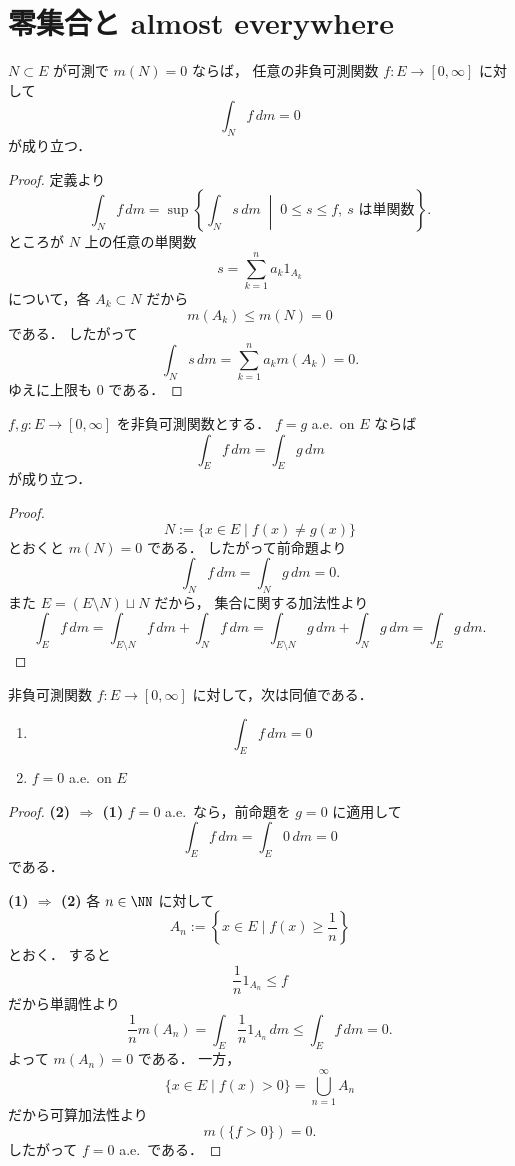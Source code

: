 \section{零集合と almost everywhere}

\begin{proposition}[零集合上の積分]
$N \subset E$ が可測で $m(N)=0$ ならば，
任意の非負可測関数 $f:E \to [0,\infty]$ に対して
\[
\int_N f\,dm=0
\]
が成り立つ．
\end{proposition}
\begin{proof}
定義より
\[
\int_N f\,dm
=
\sup\left\{
\int_N s\,dm
\;\middle|\;
0 \le s \le f,\ s \text{ は単関数}
\right\}.
\]
ところが $N$ 上の任意の単関数
\[
s=\sum_{k=1}^n a_k1_{A_k}
\]
について，各 $A_k \subset N$ だから
\[
m(A_k)\le m(N)=0
\]
である．
したがって
\[
\int_N s\,dm
=
\sum_{k=1}^n a_k m(A_k)=0.
\]
ゆえに上限も $0$ である．
\end{proof}

\begin{proposition}
$f,g:E \to [0,\infty]$ を非負可測関数とする．
$f=g$ a.e.\ on $E$ ならば
\[
\int_E f\,dm=\int_E g\,dm
\]
が成り立つ．
\end{proposition}
\begin{proof}
\[
N:=\{x \in E \mid f(x)\ne g(x)\}
\]
とおくと $m(N)=0$ である．
したがって前命題より
\[
\int_N f\,dm=\int_N g\,dm=0.
\]
また $E=(E\setminus N)\sqcup N$ だから，
集合に関する加法性より
\[
\int_E f\,dm
=
\int_{E\setminus N} f\,dm+\int_N f\,dm
=
\int_{E\setminus N} g\,dm+\int_N g\,dm
=
\int_E g\,dm.
\]
\end{proof}

\begin{proposition}
非負可測関数 $f:E \to [0,\infty]$ に対して，次は同値である．
\begin{enumerate}
    \item
    \[
    \int_E f\,dm=0
    \]
    \item $f=0$ a.e.\ on $E$
\end{enumerate}
\end{proposition}
\begin{proof}
\textbf{(2) $\Rightarrow$ (1)}\quad
$f=0$ a.e.\ なら，前命題を $g=0$ に適用して
\[
\int_E f\,dm=\int_E 0\,dm=0
\]
である．

\textbf{(1) $\Rightarrow$ (2)}\quad
各 $n \in \NN$ に対して
\[
A_n:=\left\{x \in E \mid f(x)\ge \frac1n\right\}
\]
とおく．
すると
\[
\frac1n 1_{A_n}\le f
\]
だから単調性より
\[
\frac1n m(A_n)
=
\int_E \frac1n 1_{A_n}\,dm
\le
\int_E f\,dm
=
0.
\]
よって $m(A_n)=0$ である．
一方，
\[
\{x \in E \mid f(x)>0\}
=
\bigcup_{n=1}^{\infty}A_n
\]
だから可算加法性より
\[
m(\{f>0\})=0.
\]
したがって $f=0$ a.e.\ である．
\end{proof}

